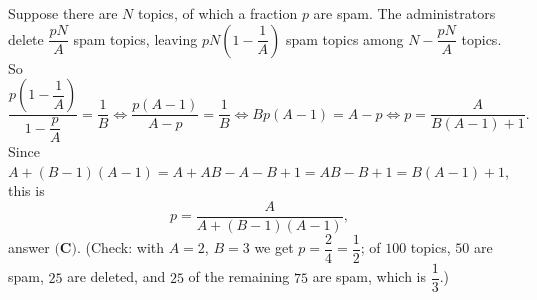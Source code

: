 Suppose there are $N$ topics, of which a fraction $p$ are spam. The administrators delete $\dfrac{pN}{A}$ spam topics, leaving $pN\left(1-\dfrac{1}{A}\right)$ spam topics among $N-\dfrac{pN}{A}$ topics. So
\[\dfrac{p\left(1-\dfrac{1}{A}\right)}{1-\dfrac {p}{A}}=\dfrac{1}{B}\iff\dfrac{p(A-1)}{A-p}=\dfrac{1}{B}\iff Bp(A-1)=A-p\iff p=\dfrac{A}{B(A-1)+1}.\]
Since $A+(B-1)(A-1)=A+AB-A-B+1=AB-B+1=B(A-1)+1$, this is
\[p=\boxed{\dfrac{A}{A+(B-1)(A-1)}},\]
answer $\textbf{(C)}$. (Check: with $A=2$, $B=3$ we get $p=\dfrac{2}{4}=\dfrac{1}{2}$; of $100$ topics, $50$ are spam, $25$ are deleted, and $25$ of the remaining $75$ are spam, which is $\dfrac{1}{3}$.)
